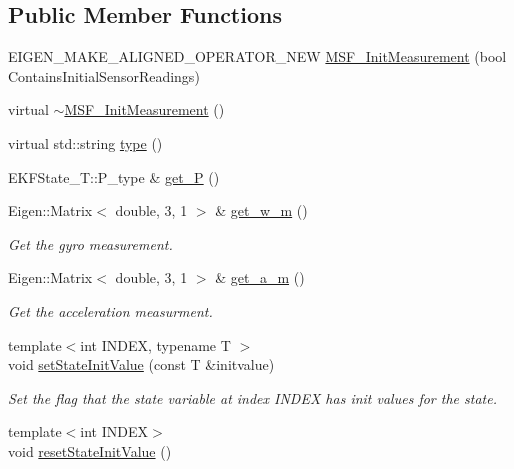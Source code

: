 \subsection*{Public Member Functions}
\begin{DoxyCompactItemize}
\item 
E\-I\-G\-E\-N\-\_\-\-M\-A\-K\-E\-\_\-\-A\-L\-I\-G\-N\-E\-D\-\_\-\-O\-P\-E\-R\-A\-T\-O\-R\-\_\-\-N\-E\-W \hyperlink{classmsf__core_1_1MSF__InitMeasurement_aaa7c4e7ea351aae40daa3ce32fb37e58}{M\-S\-F\-\_\-\-Init\-Measurement} (bool Contains\-Initial\-Sensor\-Readings)
\item 
virtual \hyperlink{classmsf__core_1_1MSF__InitMeasurement_a54cf10c917a3960d7e0e14164a18348b}{$\sim$\-M\-S\-F\-\_\-\-Init\-Measurement} ()
\item 
virtual std\-::string \hyperlink{classmsf__core_1_1MSF__InitMeasurement_a6ade2a1ba88e5f26de2125258e4c5238}{type} ()
\item 
E\-K\-F\-State\-\_\-\-T\-::\-P\-\_\-type \& \hyperlink{classmsf__core_1_1MSF__InitMeasurement_a19cc3b1efefda7694cca93d1bae441f5}{get\-\_\-\-P} ()
\item 
Eigen\-::\-Matrix$<$ double, 3, 1 $>$ \& \hyperlink{classmsf__core_1_1MSF__InitMeasurement_af0c9a4a740bc019d8a6a223d469bb42f}{get\-\_\-w\-\_\-m} ()
\begin{DoxyCompactList}\small\item\em Get the gyro measurement. \end{DoxyCompactList}\item 
Eigen\-::\-Matrix$<$ double, 3, 1 $>$ \& \hyperlink{classmsf__core_1_1MSF__InitMeasurement_a4c2c7250787e58868c9fc9596ed4c217}{get\-\_\-a\-\_\-m} ()
\begin{DoxyCompactList}\small\item\em Get the acceleration measurment. \end{DoxyCompactList}\item 
{\footnotesize template$<$int I\-N\-D\-E\-X, typename T $>$ }\\void \hyperlink{classmsf__core_1_1MSF__InitMeasurement_a972bcf6e09e13c96849b528c926b3a33}{set\-State\-Init\-Value} (const T \&initvalue)
\begin{DoxyCompactList}\small\item\em Set the flag that the state variable at index I\-N\-D\-E\-X has init values for the state. \end{DoxyCompactList}\item 
{\footnotesize template$<$int I\-N\-D\-E\-X$>$ }\\void \hyperlink{classmsf__core_1_1MSF__InitMeasurement_aa95a1f961bac237267d133035a113728}{reset\-State\-Init\-Value} ()

\end{DoxyCompactItemize}
